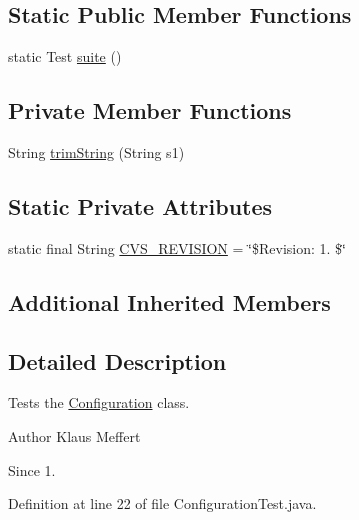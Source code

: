 \subsection*{Static Public Member Functions}
\begin{DoxyCompactItemize}
\item 
static Test \hyperlink{classorg_1_1jgap_1_1_configuration_test_a9b34ebef2bada7ebdbb3b6ff7f228362}{suite} ()
\end{DoxyCompactItemize}
\subsection*{Private Member Functions}
\begin{DoxyCompactItemize}
\item 
String \hyperlink{classorg_1_1jgap_1_1_configuration_test_ab3a5bca5d8f5f39c6469421af91d6e6e}{trim\-String} (String s1)
\end{DoxyCompactItemize}
\subsection*{Static Private Attributes}
\begin{DoxyCompactItemize}
\item 
static final String \hyperlink{classorg_1_1jgap_1_1_configuration_test_a408434dea21b170ee744e284dd545cfc}{C\-V\-S\-\_\-\-R\-E\-V\-I\-S\-I\-O\-N} = \char`\"{}\$Revision\-: 1. \$\char`\"{}
\end{DoxyCompactItemize}
\subsection*{Additional Inherited Members}


\subsection{Detailed Description}
Tests the \hyperlink{classorg_1_1jgap_1_1_configuration}{Configuration} class.

\begin{DoxyAuthor}{Author}
Klaus Meffert 
\end{DoxyAuthor}
\begin{DoxySince}{Since}
1. 
\end{DoxySince}


Definition at line 22 of file Configuration\-Test.\-java.



